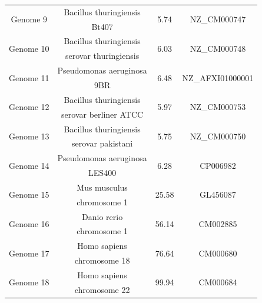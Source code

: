 \documentclass[preprint,12pt]{elsarticle}
\begin{document}
\begin{table}[!thpb]
\begin{tabular}{c  c  c c}
\multirow{2}{*}{Genome 9}&Bacillus thuringiensis&   \multirow{2}{*}{5.74} &\multirow{2}{*}{ NZ\_CM000747 }\\    &Bt407&\\
\hline    

\multirow{2}{*}{Genome 10}&Bacillus thuringiensis& \multirow{2}{*}{6.03} &\multirow{2}{*}{ NZ\_CM000748}\\    &serovar thuringiensis& \\
\hline
    
\multirow{2}{*}{Genome 11}&Pseudomonas aeruginosa& \multirow{2}{*}{6.48} &\multirow{2}{*}{NZ\_AFXI01000001}\\    &9BR&\\
\hline
    
\multirow{2}{*}{Genome 12}&Bacillus thuringiensis&  \multirow{2}{*}{5.97} &\multirow{2}{*}{ NZ\_CM000753}\\    &serovar berliner ATCC &\\
\hline
    
\multirow{2}{*}{Genome 13}&Bacillus thuringiensis& \multirow{2}{*}{5.75} &\multirow{2}{*}{ NZ\_CM000750 }\\    &serovar pakistani&\\
\hline
    
\multirow{2}{*}{Genome 14}&Pseudomonas aeruginosa& \multirow{2}{*}{6.28} &\multirow{2}{*}{CP006982}\\    &LES400&\\
\hline

\multirow{2}{*}{Genome 15}& Mus musculus & \multirow{2}{*}{25.58} &\multirow{2}{*}{GL456087}\\  &chromosome 1&\\
\hline

\multirow{2}{*}{Genome 16}& Danio rerio & \multirow{2}{*}{56.14} &\multirow{2}{*}{CM002885}\\ & chromosome 1 &\\
\hline
\multirow{2}{*}{Genome 17}&Homo sapiens & \multirow{2}{*}{76.64 } &\multirow{2}{*}{  CM000680  }\\    & chromosome 18 &\\
\hline
\multirow{2}{*}{Genome 18}&Homo sapiens & \multirow{2}{*}{99.94} &\multirow{2}{*}{CM000684   }\\ & chromosome 22&\\
\hline
\bottomrule
\end{tabular}
\end{table} 
\end{document}
